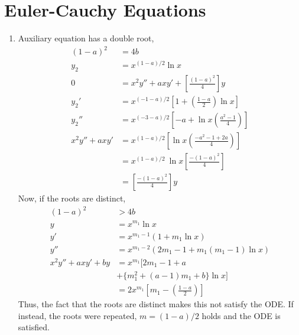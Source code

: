 \section{Euler-Cauchy Equations}

\begin{enumerate}
    \item Auxiliary equation has a double root,
          \begin{align}
              (1-a)^{2}       & = 4b                                             \\
              y_{2}           & = x^{(1-a)/2}\ln x                               \\
              0               & =               x^{2}y'' +
              axy' + \left[ \frac{(1-a)^{2}}{4} \right]y                         \\
              y_{2}'          & = x^{(-1-a)/2} \left[ 1 +
              \left( \frac{1-a}{2} \right)\ln x  \right]                         \\
              y_{2}''         & = x^{(-3-a)/2}\left[ -a +
              \ln x \left( \frac{a^{2}-1}{4} \right) \right]                     \\
              x^{2}y'' + axy' & = x^{(1-a)/2}\left[\ln x \left( \frac{-a^{2}-1 +
              2a}{4} \right)  \right]                                            \\
                              & = x^{(1-a)/2}\ \ln x\left[ \frac{-(1-a)^{2}}{4}
              \right]                                                            \\
                              & = \left[ \frac{-(1-a)^{2}}{4} \right] y
          \end{align}
          Now, if the roots are distinct,
          \begin{align}
              (1-a)^{2}            & > 4b                                              \\
              y                    & = x^{m_{1}}\ln x                                  \\
              y'                   & = x^{m_{1}-1}(1 + m_{1}\ln x)                     \\
              y''                  & = x^{m_{1} - 2}(2m_{1}-1 + m_{1}(m_{1} - 1)\ln x) \\
              x^{2}y'' + axy' + by & = x^{m_{1}} \Big[ 2m_{1} - 1 + a                  \\
                                   & + \{m_{1}^{2} + (a-1)m_{1} + b\}\ln x \Big]       \\
                                   & = 2x^{m_{1}}\left[ m_{1} - \left( \frac{1-a}{2}
                  \right) \right]
          \end{align}
          Thus, the fact that the roots are distinct makes this not satisfy the ODE.
          If instead, the roots were repeated, $ m = (1-a)/2 $ holds and the ODE
          is satisfied.


\end{enumerate}
